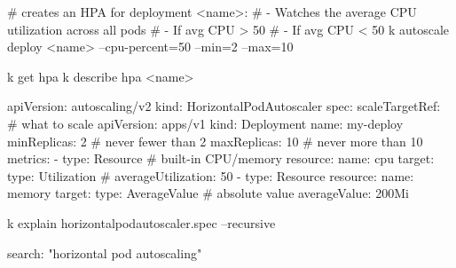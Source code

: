 \footnotesize{}

\begin{cheatcodebashbold}
#  creates an HPA for deployment <name>:
#  - Watches the average CPU utilization across all pods                                                                                                                                                 
#  - If avg CPU > 50%
#  - If avg CPU < 50%
k autoscale deploy <name> --cpu-percent=50 --min=2 --max=10
\end{cheatcodebashbold}

\begin{cheatcodebashbold}
k get hpa
k describe hpa <name>
\end{cheatcodebashbold}


\begin{cheatcodebash}
apiVersion: autoscaling/v2
kind: HorizontalPodAutoscaler
spec:
  scaleTargetRef:              # what to scale
    apiVersion: apps/v1
    kind: Deployment
    name: my-deploy
  minReplicas: 2               # never fewer than 2
  maxReplicas: 10              # never more than 10
  metrics:
  - type: Resource             # built-in CPU/memory
    resource:
      name: cpu
      target:
        type: Utilization      # %
        averageUtilization: 50
  - type: Resource
    resource:
      name: memory
      target:
        type: AverageValue     # absolute value
        averageValue: 200Mi
\end{cheatcodebash}

\begin{cheatcodebash}
k explain horizontalpodautoscaler.spec --recursive
\end{cheatcodebash}

\begin{cheatcodebash}
search: "horizontal pod autoscaling"
\end{cheatcodebash}

\footnotesize{}

